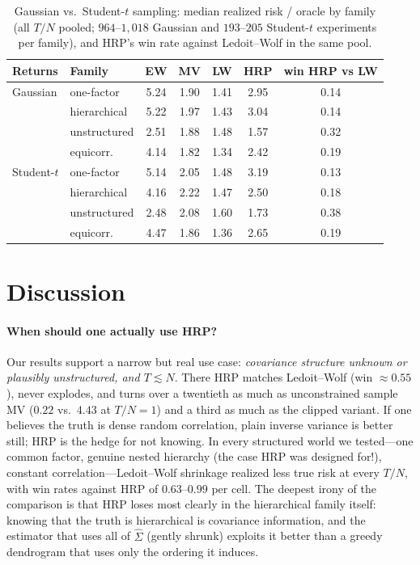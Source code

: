 \documentclass[11pt]{article}
\newcommand{\Sighat}{\widehat{\Sigma}}
\newcommand{\TN}{T/N}
\begin{document}
\begin{table}[t]
\centering
\caption{Gaussian vs.\ Student-$t$ sampling: median realized risk / oracle
by family (all $\TN$ pooled; $964$--$1{,}018$ Gaussian and $193$--$205$
Student-$t$ experiments per family), and HRP's win rate against Ledoit--Wolf
in the same pool.}
\label{tab:studentt}
\small
\begin{tabular}{ll cccc c}
\toprule
Returns & Family & EW & MV & LW & HRP & win HRP vs LW \\
\midrule
Gaussian    & one-factor    & 5.24 & 1.90 & 1.41 & 2.95 & 0.14 \\
            & hierarchical  & 5.22 & 1.97 & 1.43 & 3.04 & 0.14 \\
            & unstructured  & 2.51 & 1.88 & 1.48 & 1.57 & 0.32 \\
            & equicorr.     & 4.14 & 1.82 & 1.34 & 2.42 & 0.19 \\
\midrule
Student-$t$ & one-factor    & 5.14 & 2.05 & 1.48 & 3.19 & 0.13 \\
            & hierarchical  & 4.16 & 2.22 & 1.47 & 2.50 & 0.18 \\
            & unstructured  & 2.48 & 2.08 & 1.60 & 1.73 & 0.38 \\
            & equicorr.     & 4.47 & 1.86 & 1.36 & 2.65 & 0.19 \\
\bottomrule
\end{tabular}
\end{table}

\section{Discussion}
\label{sec:discussion}

\paragraph{When should one actually use HRP?} Our results support a narrow
but real use case: \emph{covariance structure unknown or plausibly
unstructured, and $T\lesssim N$}. There HRP matches Ledoit--Wolf (win
${\approx}0.55$), never explodes, and turns over a twentieth as much as
unconstrained sample MV ($0.22$ vs.\ $4.43$ at $\TN=1$) and a third as much
as the clipped variant. If one believes the truth is dense random correlation, plain
inverse variance is better still; HRP is the hedge for not knowing. In every
structured world we tested---one common factor, genuine nested hierarchy
(the case HRP was designed for!), constant correlation---Ledoit--Wolf
shrinkage realized less true risk at every $\TN$, with win rates against
HRP of $0.63$--$0.99$ per cell. The deepest irony of the comparison is that
HRP loses most clearly in the hierarchical family itself: knowing that the
truth is hierarchical is covariance information, and the estimator that uses
all of $\Sighat$ (gently shrunk) exploits it better than a greedy dendrogram
that uses only the ordering it induces.
\end{document}
